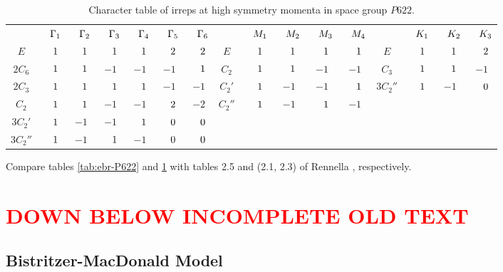 \begin{table}[H]
\caption{Character table of irreps at high symmetry momenta in space group $P622$.}
\scriptsize
\centering
\begin{tabular} { c c c c c c c | c c c c c | c c c c }
\cline{1-16}
$\P$ & $\P \Gamma_1$ & $\P \Gamma_2$ & $\P \Gamma_3$ & $\P \Gamma_4$ & $\P \Gamma_5$ & $\P \Gamma_6$ & $\P$ & $\P M_1$ & $\P M_2$ & $\P M_3$ & $\P M_4$ & $\P$ & $\P K_1$ & $\P K_2$ & $\P K_3$\\
\cline{1-16}
$E$      & $\P1$ & $\P1$ & $\P1$ & $\P1$ & $\P2$ & $\P2$ & $E$     & $\P1$ & $\P1$  & $\P1$ & $\P1$ & $E$      & $\P1$ & $\P1$ & $\P2$ \\
$2C_6$   & $\P1$ & $\P1$ & $ -1$ & $ -1$ & $ -1$ & $\P1$ & $C_2$   & $\P1$ & $\P1$  & $ -1$ & $ -1$ & $C_3$    & $\P1$ & $\P1$ & $ -1$ \\
$2C_3$   & $\P1$ & $\P1$ & $\P1$ & $\P1$ & $ -1$ & $ -1$ & $C_2'$  & $\P1$ & $ -1$  & $ -1$ & $\P1$ & $3C_2''$ & $\P1$ & $ -1$ & $\P0$ \\
$C_2$    & $\P1$ & $\P1$ & $ -1$ & $ -1$ & $\P2$ & $ -2$ & $C_2''$ & $\P1$ & $ -1$  & $\P1$ & $ -1$ &          &       &       &       \\
$3C_2'$  & $\P1$ & $ -1$ & $ -1$ & $\P1$ & $\P0$ & $\P0$ &         &       &        &       &       &          &       &       &       \\
$3C_2''$ & $\P1$ & $ -1$ & $\P1$ & $ -1$ & $\P0$ & $\P0$ &         &       &        &       &       &          &       &       &       \\
\cline{1-16}
\end{tabular}
\label{tab:char-P622}
\end{table}

Compare tables \ref{tab:ebr-P622} and \ref{tab:char-P622} with tables 2.5 and (2.1, 2.3) of Rennella \cite{thesis_rennella}, respectively.


\section{\textcolor{red}{DOWN BELOW INCOMPLETE OLD TEXT}}

\subsection{Bistritzer-MacDonald Model}

